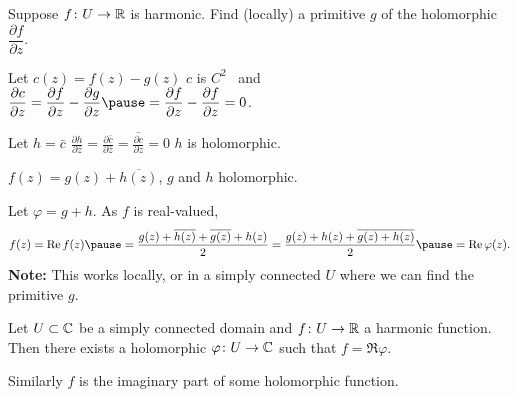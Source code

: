 \documentclass[10pt,aspectratio=169]{beamer}
\begin{document}
\begin{frame}
Suppose $f \colon U \to {\mathbb{R}}$ is harmonic.
\quad
\pause
Find (locally) a primitive $g$ of the holomorphic
$\dfrac{\partial f}{\partial z}$.

\pause

Let $c(z) = f(z)-g(z)$
\pause
\wthus
$c$ is $C^2$ ~and~ $\dfrac{\partial c}{\partial z}
=
\dfrac{\partial f}{\partial z}
-
\dfrac{\partial g}{\partial z}
\pause
=
\dfrac{\partial f}{\partial z}
-
\dfrac{\partial f}{\partial z}
= 0$.

\medskip
\pause

Let $h = \bar{c}$
\pause
\wthus
$\displaystyle
\frac{\partial h}{\partial \bar{z}}
=
\frac{\partial \bar{c}}{\partial \bar{z}}
=
\overline{
\frac{\partial c}{\partial z}
}
=
0$
\pause
\wthus
$h$ is holomorphic.

\pause
\medskip
\thus \quad
$f(z) = g(z) + \overline{h(z)}$,
\quad
$g$ and $h$ holomorphic.

\medskip
\pause

Let $\varphi = g+h$.
\pause  \quad As $f$ is real-valued,
\[
f(z) = \Re f(z)
\pause
=
\frac{g(z) + \overline{h(z)} + \overline{g(z)}+h(z)}{2}
=
\frac{g(z) + h(z) + \overline{g(z)+h(z)}}{2}
\pause
=
\Re \varphi(z) .
\]
\pause
\textbf{Note:} This works locally, or in a simply
connected $U$ where we can find the primitive $g$.

\pause

\begin{proposition}
Let $U \subset {\mathbb{C}}$ be a simply connected domain and $f \colon U \to {\mathbb{R}}$ a
harmonic function.  Then there exists a holomorphic $\varphi \colon
U \to {\mathbb{C}}$ such that $f = \Re \varphi$.
\end{proposition}

\pause

Similarly $f$ is the imaginary part of some holomorphic function.

\end{frame}
\end{document}
